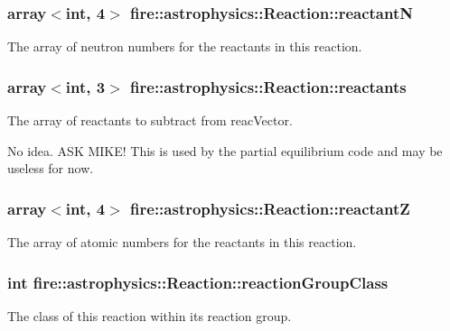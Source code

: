 \subsubsection[{reactant\+N}]{\setlength{\rightskip}{0pt plus 5cm}array$<$int, 4$>$ fire\+::astrophysics\+::\+Reaction\+::reactant\+N}\label{a00033_a831dcae79d4ed842c9bbdf51ebdd137f}
The array of neutron numbers for the reactants in this reaction. \hypertarget{a00033_ab13b0133b89c6531a1648b696324d804}{}
\subsubsection[{reactants}]{\setlength{\rightskip}{0pt plus 5cm}array$<$int, 3$>$ fire\+::astrophysics\+::\+Reaction\+::reactants}\label{a00033_ab13b0133b89c6531a1648b696324d804}
The array of reactants to subtract from reac\+Vector.

No idea. A\+S\+K M\+I\+K\+E! This is used by the partial equilibrium code and may be useless for now. \hypertarget{a00033_a74b96d4f5ff99d60adfb88b096a7e256}{}
\subsubsection[{reactant\+Z}]{\setlength{\rightskip}{0pt plus 5cm}array$<$int, 4$>$ fire\+::astrophysics\+::\+Reaction\+::reactant\+Z}\label{a00033_a74b96d4f5ff99d60adfb88b096a7e256}
The array of atomic numbers for the reactants in this reaction. \hypertarget{a00033_ab6d29b5c28ef33ea1d9219b70f02d98a}{}
\subsubsection[{reaction\+Group\+Class}]{\setlength{\rightskip}{0pt plus 5cm}int fire\+::astrophysics\+::\+Reaction\+::reaction\+Group\+Class}\label{a00033_ab6d29b5c28ef33ea1d9219b70f02d98a}
The class of this reaction within its reaction group. \hypertarget{a00033_adb666fe2c511b5a5e86ebcd35ba7faa4}{}
